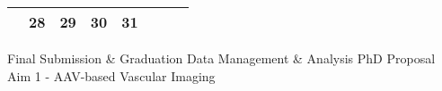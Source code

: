 {\begin{tabularx}{\linewidth}{|l!{\vrule width \myLenLineThicknessThick}*{7}{@{}X@{}|}}
       & 
    
      
      
        \begin{minipage}[t]{6mm}\centering{}28\end{minipage}
      
       & 
    
      
      
        \begin{minipage}[t]{6mm}\centering{}29\end{minipage}
      
       & 
    
      
      
        \begin{minipage}[t]{6mm}\centering{}30\end{minipage}
      
       & 
    
      
      
        \begin{minipage}[t]{6mm}\centering{}31\end{minipage}
      
       & 
    
      
      
      
        \\  \hline 
      
    
  
  
  \end{tabularx}
}
\vfill{\centering{} \small{Final Submission \& Graduation}\hspace{ 1.5em } \small{Data Management \& Analysis}\hspace{ 1.5em } \small{PhD Proposal}\hspace{ 1.5em } \small{Aim 1 - AAV-based Vascular Imaging}\hspace{ 1.5em }\par}

